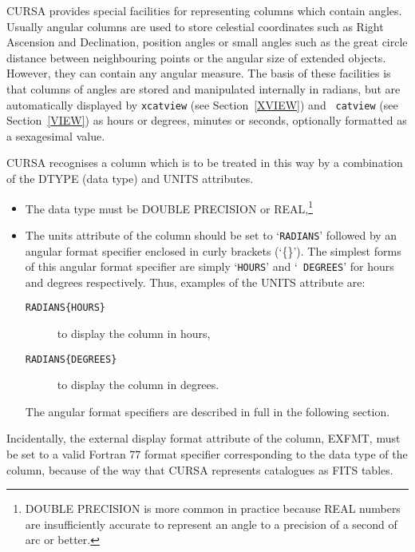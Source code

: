 \documentclass[twoside,11pt]{article}
\renewcommand{\_}{\texttt{\symbol{95}}}
\begin{document}
CURSA provides special facilities for representing columns which
contain angles. Usually angular columns are used to store celestial
coordinates such as Right Ascension and Declination, position angles
or small angles such as the great circle distance between neighbouring
points or the angular size of extended objects.  However, they
can contain any angular measure. The basis of these facilities is that
columns of angles are stored and manipulated internally in radians, but are
automatically displayed by {\tt xcatview} (see Section~\ref{XVIEW}) and {\tt
catview} (see Section~\ref{VIEW}) as hours or degrees, minutes or seconds,
optionally formatted as a sexagesimal value.

CURSA recognises a column which is to be treated in this way by a
combination of the DTYPE (data type) and UNITS attributes.

\begin{itemize}

  \item The data type must be DOUBLE PRECISION or
   REAL,\footnote{DOUBLE PRECISION is more common in practice because
   REAL numbers are insufficiently accurate to represent an angle to
   a precision of a second of arc or better.}

  \item The units attribute of the column should be set to
   `{\tt RADIANS}' followed by an angular format specifier
   enclosed in curly brackets (`\{\}'). The simplest forms of this
   angular format specifier are simply `{\tt HOURS}' and `{\tt
   DEGREES}' for hours and degrees respectively. Thus, examples of
   the UNITS attribute are:

  \begin{description}

    \item[{\tt RADIANS\{HOURS\}}] to display the column in hours,

    \item[{\tt RADIANS\{DEGREES\}}] to display the column in degrees.

  \end{description}

   The angular format specifiers are described in full in the following
   section.

\end{itemize}

Incidentally, the external display format attribute of the column, EXFMT,
must be set to a valid Fortran 77 format specifier corresponding to the
data type of the column, because of the way that CURSA represents
catalogues as FITS tables.
\end{document}
